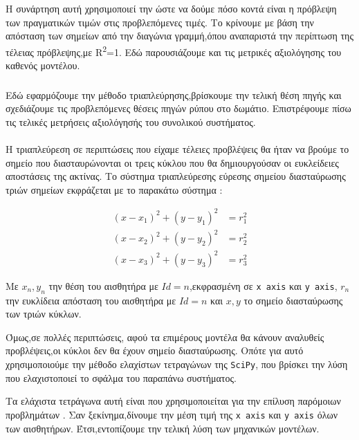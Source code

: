 Η συνάρτηση αυτή χρησιμοποιεί την \texttt{} \linebreak \texttt{} ώστε να δούμε πόσο κοντά είναι η πρόβλεψη των πραγματικών τιμών στις προβλεπόμενες τιμές.
Το κρίνουμε με βάση την απόσταση των σημείων από την διαγώνια γραμμή,όπου αναπαριστά την περίπτωση της τέλειας πρόβλεψης,με R\textsuperscript{2}=1.
Εδώ παρουσιάζουμε και τις μετρικές αξιολόγησης του καθενός μοντέλου.

\subsubsection{\texttt{}}

Εδώ εφαρμόζουμε την μέθοδο τριαπλεύρησης,βρίσκουμε την τελική θέση πηγής και σχεδιάζουμε τις προβλεπόμενες θέσεις πηγών ρύπου στο δωμάτιο.
Επιστρέφουμε πίσω τις τελικές μετρήσεις αξιολόγησής του συνολικού συστήματος.

\paragraph{\texttt{}}

Η τριαπλεύρεση σε περιπτώσεις που είχαμε τέλειες προβλέψεις θα ήταν να βρούμε το σημείο που διασταυρώνονται οι τρεις κύκλου που θα δημιουργούσαν οι ευκλείδειες αποστάσεις της ακτίνας.
Το σύστημα τριαπλεύρεσης εύρεσης σημείου διασταύρωσης τριών σημείων εκφράζεται με το παρακάτω σύστημα \cite{trilateration}:

\begin{align}
(x-x_1)^2 + (y-y_1)^2 &= r_1^2 \\
(x-x_2)^2 + (y-y_2)^2 &= r_2^2 \\
(x-x_3)^2 + (y-y_3)^2 &= r_3^2
\end{align}

Με $x_n,y_n$ την θέση του αισθητήρα με $Id=n$,εκφρασμένη σε \texttt{x axis} και \texttt{y axis}, $r_n$ την ευκλίδεια απόσταση του αισθητήρα με $Id=n$ 
και $x,y$ το σημείο διασταύρωσης των τριών κύκλων.

Όμως,σε πολλές περιπτώσεις, αφού τα επιμέρους μοντέλα θα κάνουν αναλυθείς προβλέψεις,οι κύκλοι δεν θα έχουν  σημείο διασταύρωσης.
Οπότε για αυτό χρησιμοποιούμε την μέθοδο ελαχίστων τετραγώνων 
\texttt{} της \texttt{SciPy}, που βρίσκει την λύση που ελαχιστοποιεί το σφάλμα του παραπάνω συστήματος.

Τα ελάχιστα τετράγωνα αυτή είναι που χρησιμοποιείται για την επίλυση παρόμοιων προβλημάτων \cite{leastSquaresTrilateration}.
Σαν ξεκίνημα,δίνουμε την μέση τιμή της \texttt{x axis} και \texttt{y axis} όλων των αισθητήρων.
Έτσι,εντοπίζουμε την τελική λύση των μηχανικών μοντέλων.

